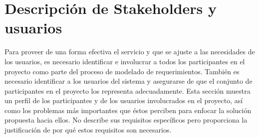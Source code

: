 \chapter{Descripción de Stakeholders y usuarios}
    Para proveer de una forma efectiva el servicio y que se ajuste a las necesidades de los usuarios, es necesario identificar e involucrar a todos los participantes en el proyecto como parte del proceso de modelado de requerimientos. También es necesario identificar a los usuarios del sistema y asegurarse de que el conjunto de participantes en el proyecto los representa adecuadamente. Esta sección muestra un perfil de los participantes y de los usuarios involucrados en el proyecto, así como los problemas más importantes que éstos perciben para enfocar la solución propuesta hacia ellos. No describe sus requisitos específicos pero proporciona la justificación de por qué estos requisitos son necesarios.

